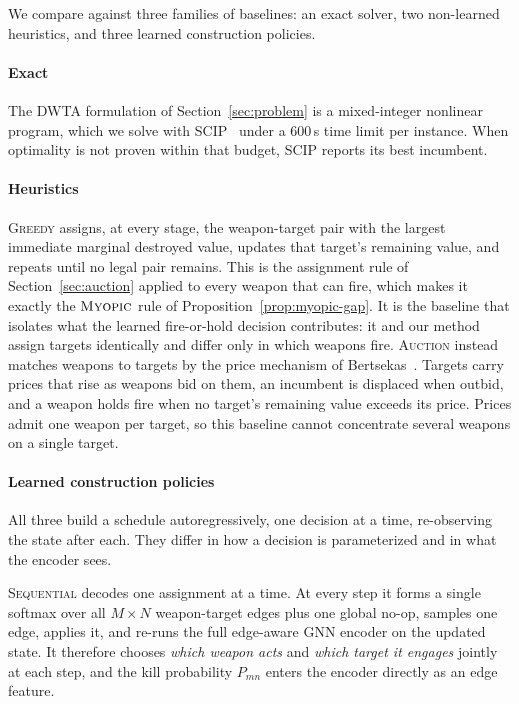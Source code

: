 We compare against three families of baselines: an exact solver, two
non-learned heuristics, and three learned construction policies.

\paragraph{Exact} The DWTA formulation of Section~\ref{sec:problem} is a
mixed-integer nonlinear program, which we solve with
SCIP~\cite{bestuzheva2023scip} under a 600\,s time limit per instance. When
optimality is not proven within that budget, SCIP reports its best incumbent.

\paragraph{Heuristics} \textsc{Greedy} assigns, at every stage, the
weapon-target pair with the largest immediate marginal destroyed value,
updates that target's remaining value, and repeats until no legal pair
remains. This is the assignment rule of Section~\ref{sec:auction} applied to
every weapon that can fire, which makes it exactly the $\textsc{Myopic}$ rule
of Proposition~\ref{prop:myopic-gap}. It is the baseline that isolates what
the learned fire-or-hold decision contributes: it and our method assign
targets identically and differ only in which weapons fire.
\textsc{Auction} instead matches weapons to targets by the price mechanism of
Bertsekas~\cite{bertsekas1988auction}. Targets carry prices that rise as
weapons bid on them, an incumbent is displaced when outbid, and a weapon
holds fire when no target's remaining value exceeds its price. Prices admit
one weapon per target, so this baseline cannot concentrate several weapons on
a single target.

\paragraph{Learned construction policies} All three build a schedule
autoregressively, one decision at a time, re-observing the state after each.
They differ in how a decision is parameterized and in what the encoder sees.

\textsc{Sequential} decodes one assignment at a time. At
every step it forms a single softmax over all $M \times N$ weapon-target edges
plus one global no-op, samples one edge, applies it, and re-runs the full
edge-aware GNN encoder on the updated state. It therefore chooses \emph{which
weapon acts} and \emph{which target it engages} jointly at each step, and the
kill probability $P_{mn}$ enters the encoder directly as an edge feature.

